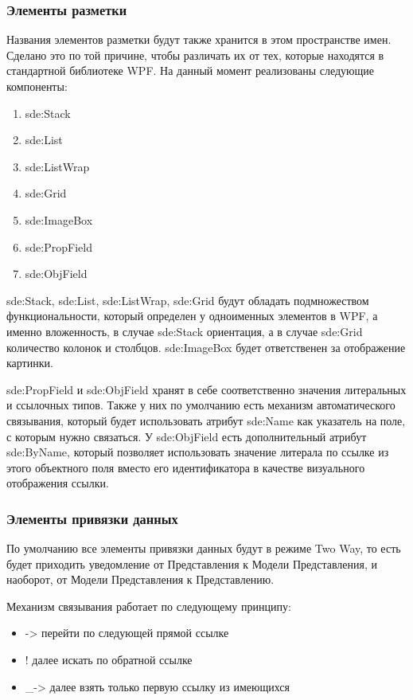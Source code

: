 \documentclass[12pt]{article}
\begin{document}
\subsubsection{Элементы разметки}
\qquad Названия элементов разметки будут также хранится в этом пространстве имен. Сделано это по той причине, чтобы различать их от тех, которые находятся в стандартной библиотеке WPF. На данный момент реализованы следующие компоненты:

\begin{enumerate}
    \item sde:Stack
    \item sde:List
    \item sde:ListWrap
    \item sde:Grid
    \item sde:ImageBox
    \item sde:PropField
    \item sde:ObjField
\end{enumerate}

sde:Stack, sde:List, sde:ListWrap, sde:Grid будут обладать подмножеством функциональности, который определен у одноименных элементов в WPF, а именно вложенность, в случае sde:Stack ориентация, а в случае sde:Grid количество колонок и столбцов. sde:ImageBox будет ответственен за отображение картинки.\par

sde:PropField и sde:ObjField хранят в себе соответственно значения литеральных и ссылочных типов. Также у них по умолчанию есть механизм автоматического связывания, который будет использовать атрибут sde:Name как указатель на поле, с которым нужно связаться. У sde:ObjField есть дополнительный атрибут sde:ByName, который позволяет использовать значение литерала по ссылке из этого объектного поля вместо его идентификатора в качестве визуального отображения ссылки.\par

\subsubsection{Элементы привязки данных}
\qquad По умолчанию все элементы привязки данных будут в режиме Two Way, то есть будет приходить уведомление от Представления к Модели Представления, и наоборот, от Модели Представления к Представлению.\par

Механизм связывания работает по следующему принципу:
\begin{itemize}
    \item -> перейти по следующей прямой ссылке
    \item ! далее искать по обратной ссылке
    \item \_-> далее взять только первую ссылку из имеющихся
\end{itemize}
\end{document}
